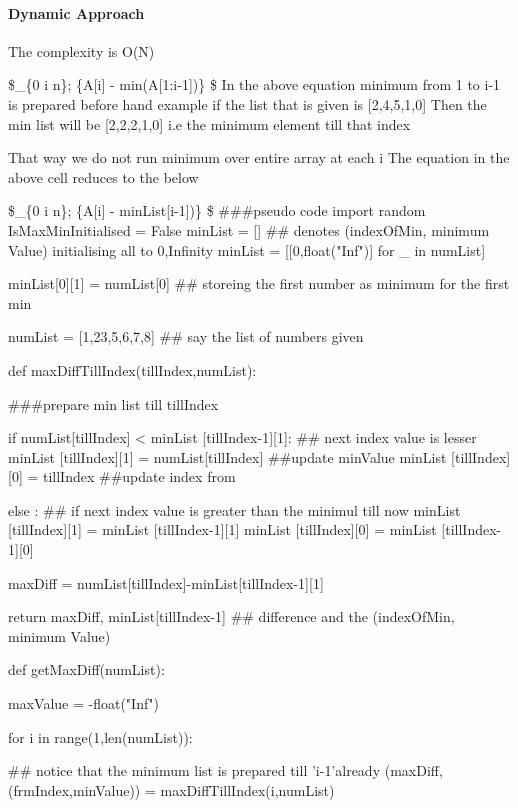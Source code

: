 \documentclass[11pt]{article}
\begin{document}
    \paragraph{Dynamic Approach}\label{dynamic-approach}

The complexity is O(N)

    \$\max\_\{0 \leq i \leq n\}; \{A{[}i{]} - min(A{[}1:i-1{]})\} \$
In the above equation minimum from 1 to i-1 is prepared before hand
example if the list that is given is [2,4,5,1,0]
Then the min list will be [2,2,2,1,0] i.e the minimum element till that index

That way we do not run minimum over entire array at each i
The equation in the above cell reduces to the below

    \$\max\_\{0 \leq i \leq n\}; \{A{[}i{]} - minList{[}i-1{]})\} \$
###pseudo code
import random
IsMaxMinInitialised = False
minList  = []
## denotes (indexOfMin, minimum Value) initialising all to 0,Infinity
minList = [[0,float("Inf")] for _ in numList] 

minList[0][1] = numList[0] ## storeing the first number as minimum for the first min

numList = [1,23,5,6,7,8] ## say the list of numbers given

def maxDiffTillIndex(tillIndex,numList):
      
    ###prepare min list till tillIndex
    
    if numList[tillIndex] < minList [tillIndex-1][1]: ## next index value is lesser
        minList [tillIndex][1] = numList[tillIndex] ##update minValue
        minList [tillIndex][0] = tillIndex ##update index from
        
        
    else : ## if next index value is greater than the minimul till now
        minList [tillIndex][1] = minList [tillIndex-1][1]
        minList [tillIndex][0] = minList [tillIndex-1][0]
    
    
    maxDiff = numList[tillIndex]-minList[tillIndex-1][1]
    
    return maxDiff, minList[tillIndex-1] ## difference and the (indexOfMin, minimum Value)



def getMaxDiff(numList):
    
    
    maxValue = -float("Inf") 
    
    for i in range(1,len(numList)):
    
        ## notice that the minimum list is prepared till 'i-1'already 
        (maxDiff,(frmIndex,minValue))  = maxDiffTillIndex(i,numList) 
             
\end{document}
